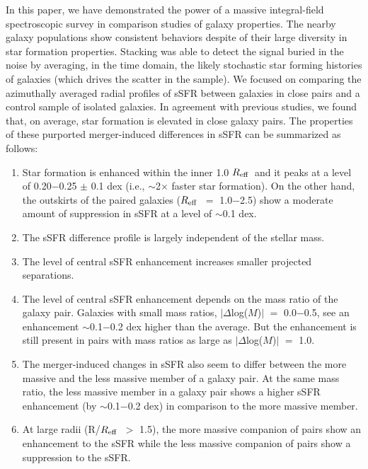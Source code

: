 \documentclass[apj,twocolumn]{emulateapj}
\newcommand{\reff}{$R_{\rm eff}$}
\begin{document}
\begin{CJK*}{UTF8}{gbsn}
In this paper, we have demonstrated the power of a massive integral-field spectroscopic survey in comparison studies of galaxy properties. The nearby galaxy populations show consistent behaviors despite of their large diversity in star formation properties. Stacking was able to detect the signal buried in the noise by averaging, in the time domain, the likely stochastic star forming histories of galaxies (which drives the scatter in the sample). We focused on comparing the azimuthally averaged radial profiles of sSFR between galaxies in close pairs and a control sample of isolated galaxies. In agreement with previous studies, we found that, on average, star formation is elevated in close galaxy pairs. The properties of these purported merger-induced differences in sSFR can be summarized as follows:

\begin{enumerate}

\item Star formation is enhanced within the inner 1.0 \reff\ and it peaks at a level of 0.20$-$0.25 $\pm$ 0.1 dex (i.e., $\sim$2$\times$ faster star formation). On the other hand, the outskirts of the paired galaxies (\reff\ $=$ 1.0$-$2.5) show a moderate amount of suppression in sSFR at a level of $\sim$0.1 dex.
 
\item The sSFR difference profile is largely independent of the stellar mass.

\item The level of central sSFR enhancement increases smaller projected separations. 

\item The level of central sSFR enhancement depends on the mass ratio of the galaxy pair. Galaxies with small mass ratios, $|\Delta$log($M$)$|$ $=$ 0.0$-$0.5, see an enhancement $\sim$0.1$-$0.2 dex higher than the average. But the enhancement is still present in pairs with mass ratios as large as $|\Delta$log($M$)$|$ $=$ 1.0. 

\item The merger-induced changes in sSFR also seem to differ between the more massive and the less massive member of a galaxy pair. At the same mass ratio, the less massive member in a galaxy pair shows a higher sSFR enhancement (by $\sim$0.1$-$0.2 dex) in comparison to the more massive member. 

\item At large radii (R/\reff\ $>$ 1.5), the more massive companion of pairs show an enhancement to the sSFR while the less massive companion of pairs show a suppression to the sSFR.


\end{enumerate}
\end{CJK*}
\end{document}
